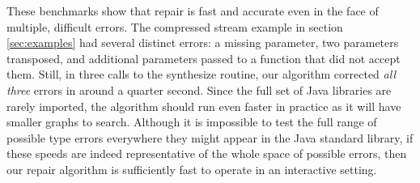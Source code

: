 These benchmarks show that repair is fast and accurate even in the face of multiple, difficult errors. The compressed stream example in section \ref{sec:examples} had several distinct errors: a missing parameter, two parameters transposed, and additional parameters passed to a function that did not accept them. Still, in three calls to the synthesize routine, our algorithm corrected \textit{all three} errors in around a quarter second. Since the full set of Java libraries are rarely imported, the algorithm should run even faster in practice as it will have smaller graphs to search. Although it is impossible to test the full range of possible type errors everywhere they might appear in the Java standard library, if these speeds are indeed representative of the whole space of possible errors, then our repair algorithm is sufficiently fast to operate in an interactive setting.
